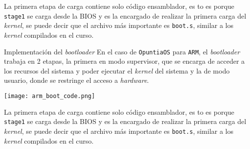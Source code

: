 \begin{frame}{}
	La primera etapa de carga contiene solo código ensamblador, es to es porque \texttt{stage1} se carga desde la BIOS y es la encargado de realizar la primera carga del \textit{kernel}, se puede decir que el archivo más importante es \texttt{boot.s}, similar a los \textit{kernel} compilados en el curso.
\end{frame}


\begin{frame}{Implementación del \textit{bootloader}}
	En el caso de \texttt{OpuntiaOS} para \texttt{ARM}, el \textit{bootloader} trabaja en 2 etapas, la primera en modo supervisor, que se encarga de acceder a los recursos del sistema y poder ejecutar el \textit{kernel} del sistema y la de modo usuario, donde se restringe el acceso a \textit{hardware}.
	\begin{center}
		\texttt{[image: arm\_boot\_code.png]}
	\end{center}
\end{frame}

\begin{frame}{}
	La primera etapa de carga contiene solo código ensamblador, es to es porque \texttt{stage1} se carga desde la BIOS y es la encargado de realizar la primera carga del \textit{kernel}, se puede decir que el archivo más importante es \texttt{boot.s}, similar a los \textit{kernel} compilados en el curso.
\end{frame}




